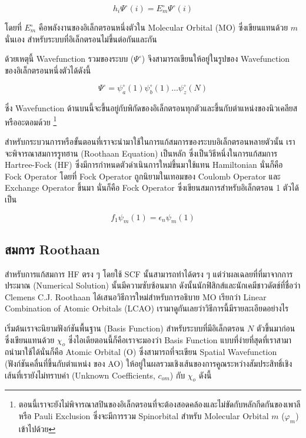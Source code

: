 \begin{equation}
    h_{i} \Psi^{\circ}(i) = E^{\circ}_{m} \Psi^{\circ}(i)
\end{equation}

โดยที่ $E^{\circ}_{m}$ คือพลังงานของอิเล็กตรอนหนึ่งตัวใน Molecular Orbital (MO) ซึ่งเขียนแทนด้วย $m$ นั่นเอง สำหรับระบบที่อิเล็กตรอนไม่ขึ้นต่อกันและกัน

ด้วยเหตุนี้ Wavefunction รวมของระบบ ($\Psi^{\circ}$) จึงสามารถเขียนให้อยู่ในรูปของ Wavefunction ของอิเล็กตรอนหนึ่งตัวได้ดังนี้

\begin{equation}
    \Psi^{\circ} = \psi^{\circ}_{a}(1) \psi^{\circ}_{b}(1) \dots \psi^{\circ}_{z}(N)
\end{equation}

ซึ่ง Wavefunction ด้านบนนี้จะขึ้นอยู่กับพิกัดของอิเล็กตรอนทุกตัวและขึ้นกับตำแหน่งของนิวเคลียสหรืออะตอมด้วย
\footnote{ตอนนี้เราจะยังไม่พิจารณาสปินของอิเล็กตรอนที่จะต้องสอดคล้องและไม่ขัดกับหลักกีดกันของเพาลีหรือ Pauli Exclusion 
ซึ่งจะมีการรวม Spinorbital สำหรับ Molecular Orbital $m$ ($\varphi_{m}$) เข้าไปด้วย}

สำหรับกระบวนการหรือขั้นตอนที่เราจะนำมาใช้ในการแก้สมการของระบบอิเล็กตรอนหลายตัวนั้น เราจะพิจารณาสมการรูทฮาน (Roothaan Equation) เป็นหลัก
ซึ่งเป็นวิธีหนึ่งในการแก้สมการ Hartree-Fock (HF) ซึ่งมีการกำหนดตัวดำเนินการใหม่ขึ้นมาใช้แทน Hamiltonian นั่นก็คือ Fock Operator 
โดยที่ Fock Operator ถูกนิยามในเทอมของ Coulomb Operator และ Exchange Operator ขึ้นมา นั่นก็คือ Fock Operator 
ซึ่งเขียนสมการสำหรับอิเล็กตรอน 1 ตัวได้เป็น

\begin{equation}
    \label{eq:fock}
    f_{1} \psi_{m}(1) = \epsilon_{n} \psi_{m}(1)
\end{equation}

\subsection{สมการ Roothaan}

สำหรับการแก้สมการ HF ตรง ๆ โดยใช้ SCF นั้นสามารถทำได้ตรง ๆ แต่ว่าผลเฉลยที่ที่มาจากการประมาณ (Numerical Solution) นั้นมีความซับซ้อนมาก
ดังนั้นนักฟิสิกส์และนักเคมีชาวดัตช์ที่ชื่อว่า Clemens C.J. Roothaan ได้เสนอวิธีการใหม่สำหรับการอธิบาย MO เรียกว่า Linear Combination of Atomic Orbitals (LCAO)
เรามาดูกันเลยว่าวิธีการนี้มีรายละเอียดอย่างไร

เริ่มต้นเราจะนิยามฟังก์ชันพื้นฐาน (Basis Function) สำหรับระบบที่มีอิเล็กตรอน $N$ ตัวขึ้นมาก่อน ซึ่งเขียนแทนด้วย $\chi_{o}$
ซึ่งไอเดียตอนนี้ก็คือเราจะมองว่า Basis Function แบบที่ง่ายที่สุดที่เราสามาถนำมาใช้ได้นั่นก็คือ Atomic Orbital (O) ซึ่งสามารถที่จะเขียน Spatial Wavefunction 
(ฟังก์ชันคลื่นที่ขึ้นกับตำแหน่ง ของ AO) ให้อยู่ในผลรวมเชิงเส้นของการคูณระหว่างสัมประสิทธิ์เชิงเส้นที่เรายังไม่ทราบค่า (Unknown Coefficients, $c_{om}$) 
กับ $\chi_{o}$ ดังนี้

